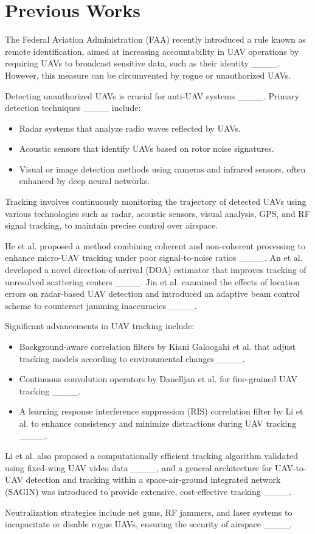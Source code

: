 \section{Previous Works}
The Federal Aviation Administration (FAA) recently introduced a rule known as remote identification, aimed at increasing accountability in UAV operations by requiring UAVs to broadcast sensitive data, such as their identity ____. However, this measure can be circumvented by rogue or unauthorized UAVs.

Detecting unauthorized UAVs is crucial for anti-UAV systems ____. Primary detection techniques ____ include:
\begin{itemize}
  \item Radar systems that analyze radio waves reflected by UAVs.
  \item Acoustic sensors that identify UAVs based on rotor noise signatures.
  \item Visual or image detection methods using cameras and infrared sensors, often enhanced by deep neural networks.
\end{itemize}

Tracking involves continuously monitoring the trajectory of detected UAVs using various technologies such as radar, acoustic sensors, visual analysis, GPS, and RF signal tracking, to maintain precise control over airspace.

He et al. proposed a method combining coherent and non-coherent processing to enhance micro-UAV tracking under poor signal-to-noise ratios ____. An et al. developed a novel direction-of-arrival (DOA) estimator that improves tracking of unresolved scattering centers ____. Jin et al. examined the effects of location errors on radar-based UAV detection and introduced an adaptive beam control scheme to counteract jamming inaccuracies ____.

Significant advancements in UAV tracking include:
\begin{itemize}
  \item Background-aware correlation filters by Kiani Galoogahi et al. that adjust tracking models according to environmental changes ____.
  \item Continuous convolution operators by Danelljan et al. for fine-grained UAV tracking ____.
  \item A learning response interference suppression (RIS) correlation filter by Li et al. to enhance consistency and minimize distractions during UAV tracking ____.
\end{itemize}
Li et al. also proposed a computationally efficient tracking algorithm validated using fixed-wing UAV video data ____, and a general architecture for UAV-to-UAV detection and tracking within a space-air-ground integrated network (SAGIN) was introduced to provide extensive, cost-effective tracking ____.

Neutralization strategies include net guns, RF jammers, and laser systems to incapacitate or disable rogue UAVs, ensuring the security of airspace ____.